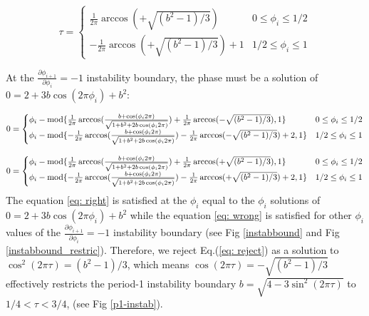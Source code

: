 \begin{equation} 
    \tau =
    \begin{cases}
        \frac{1}{2\pi}\arccos(+\sqrt{(b^2 - 1)/3}) & 0 \leq \phi_i \leq 1/2 \\
       -\frac{1}{2\pi}\arccos(+\sqrt{(b^2 - 1)/3}) + 1 & 1/2 \leq \phi_i \leq 1
    \end{cases}
    \label{eq: reject}
\end{equation} 

At the $\frac{\partial \phi_{i+1}}{\partial \phi_i} = -1$ instability boundary, the phase must be a solution of $0 = 2+3b\cos(2\pi \phi_i) + b^2$:

\begin{equation} 
    0 = 
    \begin{cases}
       \phi_i - \textnormal{mod} \{\frac{1}{2\pi}\arccos(\frac{b+\cos(\phi_i 2\pi)}{\sqrt{1+b^2+2b\cos(\phi_i 2\pi)}}) + \frac{1}{2\pi}\arccos(-\sqrt{(b^2 - 1)/3}),1\}& 0 \leq \phi_i \leq 1/2 \\
       \phi_i - \textnormal{mod} \{-\frac{1}{2\pi}\arccos(\frac{b+\cos(\phi_i 2\pi)}{\sqrt{1+b^2+2b\cos(\phi_i 2\pi)}})-\frac{1}{2\pi}\arccos(-\sqrt{(b^2 - 1)/3}) + 2,1\}& 1/2 \leq \phi_i \leq 1 \\
    \end{cases}
    \label{eq: right}
\end{equation} 

\begin{equation} 
    0 = 
    \begin{cases}
       \phi_i - \textnormal{mod} \{\frac{1}{2\pi}\arccos(\frac{b+\cos(\phi_i 2\pi)}{\sqrt{1+b^2+2b\cos(\phi_i 2\pi)}}) + \frac{1}{2\pi}\arccos(+\sqrt{(b^2 - 1)/3}),1\}& 0 \leq \phi_i \leq 1/2 \\
       \phi_i - \textnormal{mod} \{-\frac{1}{2\pi}\arccos(\frac{b+\cos(\phi_i 2\pi)}{\sqrt{1+b^2+2b\cos(\phi_i 2\pi)}})-\frac{1}{2\pi}\arccos(+\sqrt{(b^2 - 1)/3}) + 2,1\}& 1/2 \leq \phi_i \leq 1 \\
    \end{cases}
    \label{eq: wrong}
\end{equation} 
The equation \ref{eq: right} is satisfied at the $\phi_i$ equal to the $\phi_i$ solutions of $0 = 2+3b\cos(2\pi \phi_i) + b^2$ while the equation \ref{eq: wrong} is satisfied for other $\phi_i$ values of the $\frac{\partial \phi_{i+1}}{\partial \phi_i} = -1$ instability boundary (see Fig \ref{instabbound} and Fig \ref{instabbound_restric}). Therefore, we reject Eq.(\ref{eq: reject}) as a solution to $\cos^2(2\pi\tau) = (b^2 - 1)/3$, which means $\cos(2\pi\tau) = -\sqrt{(b^2 - 1)/3}$ effectively restricts the period-1 instability boundary $b = \sqrt{4-3\sin^2(2\pi\tau)}$ to $1/4<\tau<3/4$, (see Fig \ref{p1-instab}).

